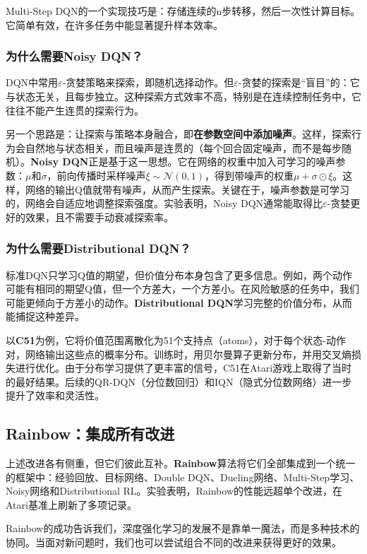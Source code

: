 \documentclass[lang=cn,zihao=-4,a4paper,fontset=windows]{beautybook}
\begin{document}
Multi-Step DQN的一个实现技巧是：存储连续的n步转移，然后一次性计算目标。它简单有效，在许多任务中能显著提升样本效率。

\subsubsection{为什么需要Noisy DQN？}

DQN中常用$\varepsilon$-贪婪策略来探索，即随机选择动作。但$\varepsilon$-贪婪的探索是“盲目”的：它与状态无关，且每步独立。这种探索方式效率不高，特别是在连续控制任务中，它往往不能产生连贯的探索行为。

另一个思路是：让探索与策略本身融合，即\textbf{在参数空间中添加噪声}。这样，探索行为会自然地与状态相关，而且噪声是连贯的（每个回合固定噪声，而不是每步随机）。\textbf{Noisy DQN}正是基于这一思想。它在网络的权重中加入可学习的噪声参数：$\mu$和$\sigma$，前向传播时采样噪声$\xi \sim \mathcal{N}(0,1)$，得到带噪声的权重$\mu + \sigma \odot \xi$。这样，网络的输出Q值就带有噪声，从而产生探索。关键在于，噪声参数是可学习的，网络会自适应地调整探索强度。实验表明，Noisy DQN通常能取得比$\varepsilon$-贪婪更好的效果，且不需要手动衰减探索率。

\subsubsection{为什么需要Distributional DQN？}

标准DQN只学习Q值的期望，但价值分布本身包含了更多信息。例如，两个动作可能有相同的期望Q值，但一个方差大，一个方差小。在风险敏感的任务中，我们可能更倾向于方差小的动作。\textbf{Distributional DQN}学习完整的价值分布，从而能捕捉这种差异。

以\textbf{C51}为例，它将价值范围离散化为51个支持点（atoms），对于每个状态-动作对，网络输出这些点的概率分布。训练时，用贝尔曼算子更新分布，并用交叉熵损失进行优化。由于分布学习提供了更丰富的信号，C51在Atari游戏上取得了当时的最好结果。后续的QR-DQN（分位数回归）和IQN（隐式分位数网络）进一步提升了效率和灵活性。

\subsection{Rainbow：集成所有改进}

上述改进各有侧重，但它们彼此互补。\textbf{Rainbow}算法将它们全部集成到一个统一的框架中：经验回放、目标网络、Double DQN、Dueling网络、Multi-Step学习、Noisy网络和Distributional RL。实验表明，Rainbow的性能远超单个改进，在Atari基准上刷新了多项记录。

Rainbow的成功告诉我们，深度强化学习的发展不是靠单一魔法，而是多种技术的协同。当面对新问题时，我们也可以尝试组合不同的改进来获得更好的效果。
\end{document}
